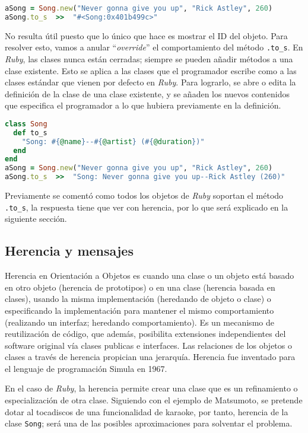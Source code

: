 \begin{lstlisting}[language=Ruby]
aSong = Song.new("Never gonna give you up", "Rick Astley", 260)
aSong.to_s	>>	"#<Song:0x401b499c>" 
\end{lstlisting}

No resulta útil puesto que lo único que hace es mostrar el ID del objeto. Para resolver esto, vamos a anular ``\textit{override}'' el comportamiento del método \texttt{.to\_s}.
En \textit{Ruby}, las clases nunca están cerradas; siempre se pueden añadir métodos a una clase existente. Esto se aplica a las clases que el programador escribe como a las clases estándar que vienen por defecto en \textit{Ruby}. Para lograrlo, se abre o edita la definición de la clase de una clase existente, y se añaden los nuevos contenidos que especifica el programador a lo que hubiera previamente en la definición.

\begin{lstlisting}[language=Ruby]
class Song
  def to_s
    "Song: #{@name}--#{@artist} (#{@duration})"
  end
end
aSong = Song.new("Never gonna give you up", "Rick Astley", 260)
aSong.to_s	>>	"Song: Never gonna give you up--Rick Astley (260)"
\end{lstlisting}

Previamente se comentó como todos los objetos de \textit{Ruby} soportan el método \texttt{.to\_s}, la respuesta tiene que ver con herencia, por lo que será explicado en la siguiente sección.

\subsection{Herencia y mensajes}
Herencia en Orientación a Objetos es cuando una clase o un objeto está basado en otro objeto (herencia de prototipos) o en una clase (herencia basada en clases), usando la misma implementación (heredando de objeto o clase) o especificando la implementación para mantener el mismo comportamiento (realizando un interfaz; heredando comportamiento). Es un mecanismo de reutilización de código, que además, posibilita extensiones independientes del software original vía clases publicas e interfaces. Las relaciones de los objetos o clases a través de herencia propician una jerarquía. Herencia fue inventado para el lenguaje de programación Simula en 1967.\cite{MintzEkendahl2006}

En el caso de \textit{Ruby}, la herencia permite crear una clase que es un refinamiento o especialización de otra clase. Siguiendo con el ejemplo de Matsumoto, se pretende dotar al tocadiscos de una funcionalidad de karaoke, por tanto, herencia de la clase \texttt{Song}; será una de las posibles aproximaciones para solventar el problema.


